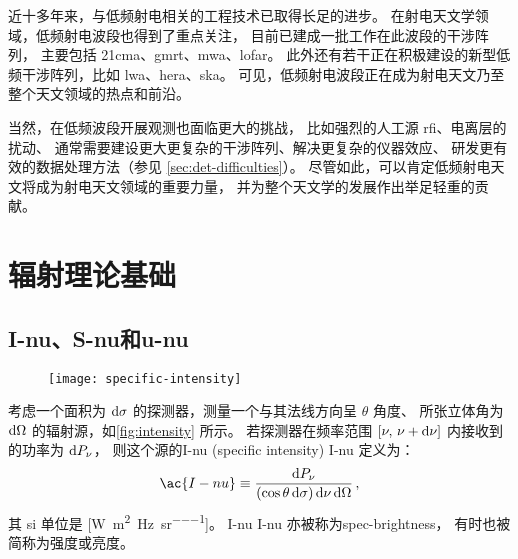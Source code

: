 近十多年来，与低频射电相关的工程技术已取得长足的进步。
在射电天文学领域，低频射电波段也得到了重点关注，
目前已建成一批工作在此波段的干涉阵列，
主要包括 \ac{21cma}、\ac{gmrt}、\ac{mwa}、\ac{lofar}。
此外还有若干正在积极建设的新型低频干涉阵列，比如 \ac{lwa}、\ac{hera}、\ac{ska}。
可见，低频射电波段正在成为射电天文乃至整个天文领域的热点和前沿。

当然，在低频波段开展观测也面临更大的挑战，
比如强烈的人工源 \ac{rfi}、电离层的扰动、
通常需要建设更大更复杂的干涉阵列、解决更复杂的仪器效应、
研发更有效的数据处理方法（参见 \autoref{sec:det-difficulties}）。
尽管如此，可以肯定低频射电天文将成为射电天文领域的重要力量，
并为整个天文学的发展作出举足轻重的贡献。


\section{辐射理论基础}
\label{sec:radiation}

\subsection{\acl*{I-nu}、\acl*{S-nu}和\acl*{u-nu}}

\begin{figure}[htp]
  \centering
  \texttt{[image: specific-intensity]}
  \label{fig:intensity}
\end{figure}

考虑一个面积为 $\mathrm{d}\sigma$ 的探测器，测量一个与其法线方向呈 $\theta$ 角度、
所张立体角为 $\mathrm{d}\Omega$ 的辐射源，如\autoref{fig:intensity} 所示。
若探测器在频率范围 $[\nu, \,\nu+\mathrm{d}\nu]$ 内接收到的功率为 $\mathrm{d}P_{\nu}$，
则这个源的\acl{I-nu} (specific intensity) \ac{I-nu} 定义为：
\begin{equation}
  \label{eq:intensity}
  \ac{I-nu} \equiv
    \frac{\D{P_{\nu}}}{(\cos\theta\,\D{\sigma}) \,\D{\nu} \,\D{\Omega}} \,,
\end{equation}
其 \ac{si} 单位是 [\si{\watt\per\square\meter\per\hertz\per\steradian}]。
\acl{I-nu} \ac{I-nu} 亦被称为\ac{spec-brightness}，
有时也被简称为强度或亮度。

